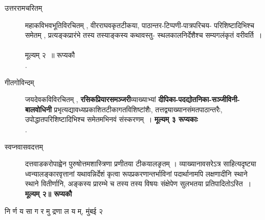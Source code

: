 \documentclass[11pt, openany]{book}
\begin{document}
\newpage
\pagestyle{fancy}
\cfoot{}
\begin{description}
\item[उत्तररामचरितम् \textendash]  महाकविभवभूतिविरचितम् , वीरराघवकृतटीकया, पाठान्तर-टिप्पणी-पात्रपरिचय- परिशिष्टादिभिश्च 
 समेतम् , प्रत्यङ्कप्रारंभे तस्य तस्याङ्कस्य कथावस्तु- स्थलकालनिर्देशैश्च सम्यगलंकृतं वरीवर्ति~।~\\
\hspace*{\fill} मूल्यम् २~॥ रूप्यकौ \\
{\hspace*{\fill}\bld . \hspace*{\fill}}\\

\item[गीतगोविन्दम् \textemdash\ ] जयदेवकविविरचितम् , \textbf{रसिकप्रियारसमञ्जरी}व्याख्याभ्यां \textbf{दीपिका-पदद्योतनिका-सञ्जीविनी- बालवोधिनी} प्रभृत्यद्यावध्यप्रकाशितटीकागतविशिष्टांशैः, तत्तद्व्याख्यानसंमतपाठान्तरैः, उपोद्धातपरिशिष्टादिभिश्च समेतमभिनवं संस्करणम्~।
\hspace*{\fill} \textbf{मूल्यम् ३ रूप्यकाः}\\
{\hspace*{\fill}\bld . \hspace*{\fill}}\\

\item[स्वप्नवासवदत्तम् \textemdash\ ] दत्तवाडकरोपाह्वेन पुरुषोत्तमशास्त्रिणा प्रणीतया टीकयालङृतम् । व्याख्यानावसरेऽत्र साहित्यदृष्ट्या 
 ध्वन्यालङ्कारवृत्तानां यथावन्निर्देशं कृत्वा रूपप्रकरणान्तर्भाविनां पदार्थानामपि लक्षणादीनि स्थाने स्थाने वितीर्णानि, 
 अङ्कस्य प्रारम्भे च तस्य तस्य विषयः संक्षेपेण सुलभतया 
 प्रतिपादितोऽस्ति~।~\\
\hspace*{\fill} \textbf{मूल्यम् २॥ रूप्यकौ}
\end{description}
\begin{center}
\bl
  नि र्ण य सा ग र मु द्रणा ल य म्, मुंबई २ 
\end{center}
 
\end{document}
